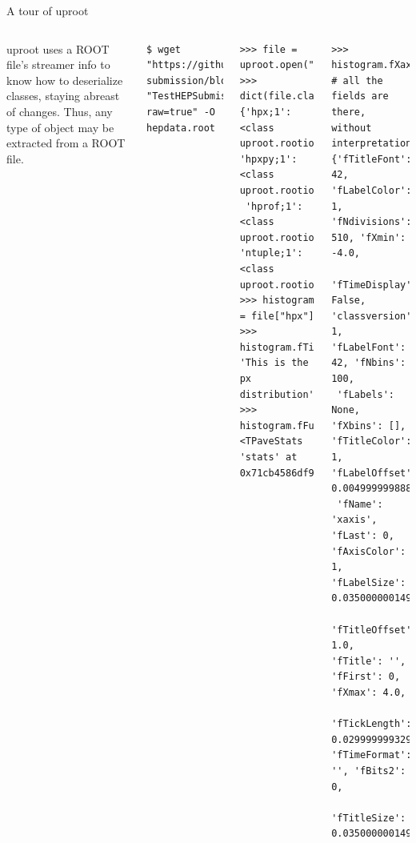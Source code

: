 \documentclass[aspectratio=169]{beamer}
\begin{document}
\begin{frame}[fragile]{A tour of uproot}
\vspace{0.35 cm}
\scriptsize

\begin{columns}
{\normalsize uproot uses a ROOT file's streamer info to know how to deserialize classes, staying abreast of changes. Thus, any type of object may be extracted from a ROOT file.}

\begin{verbatim}
$ wget "https://github.com/HEPData/hepdata-submission/blob/master/examples/submission/"\
"TestHEPSubmission/root_file.root?raw=true" -O hepdata.root
\end{verbatim}

\begin{verbatim}
>>> file = uproot.open("hepdata.root")
>>> dict(file.classes())
{'hpx;1': <class uproot.rootio.TH1F>, 'hpxpy;1': <class uproot.rootio.TH2F>,
 'hprof;1': <class uproot.rootio.TProfile>, 'ntuple;1': <class uproot.rootio.TNtuple>}
>>> histogram = file["hpx"]
>>> histogram.fTitle
'This is the px distribution'
>>> histogram.fFunctions[0]
<TPaveStats 'stats' at 0x71cb4586df90>
\end{verbatim}
\begin{verbatim}
>>> histogram.fXaxis.__dict__           # all the fields are there, without interpretation
{'fTitleFont': 42, 'fLabelColor': 1, 'fNdivisions': 510, 'fXmin': -4.0,
 'fTimeDisplay': False, 'classversion': 1, 'fLabelFont': 42, 'fNbins': 100,
 'fLabels': None, 'fXbins': [], 'fTitleColor': 1, 'fLabelOffset': 0.004999999888241291,
 'fName': 'xaxis', 'fLast': 0, 'fAxisColor': 1, 'fLabelSize': 0.03500000014901161,
 'fTitleOffset': 1.0, 'fTitle': '', 'fFirst': 0, 'fXmax': 4.0,
 'fTickLength': 0.029999999329447746, 'fTimeFormat': '', 'fBits2': 0,
 'fTitleSize': 0.03500000014901161}
\end{verbatim}
\end{columns}
\end{frame}
\end{document}
